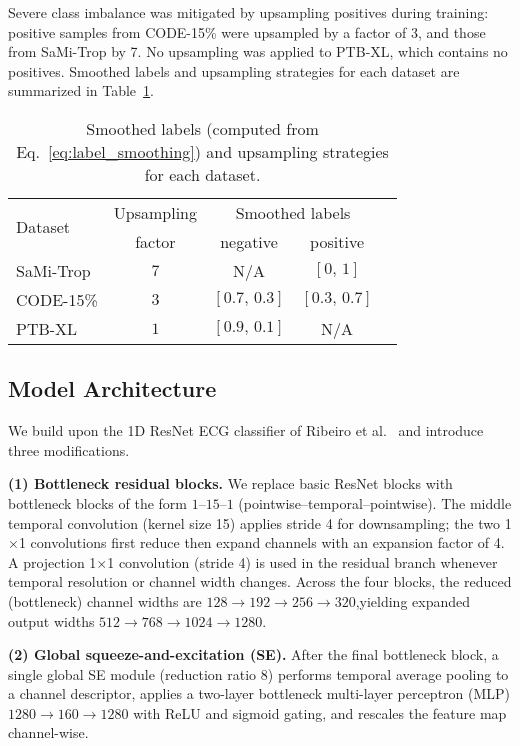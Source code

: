 Severe class imbalance was mitigated by upsampling positives during training: positive samples from CODE-15\% were upsampled by a factor of 3, and those from SaMi-Trop by 7. No upsampling was applied to PTB-XL, which contains no positives. Smoothed labels and upsampling strategies for each dataset are summarized in Table~\ref{tab:augmentation}.


\begin{table}[!htp]
\centering
\begin{tabular}{lcccc}
\toprule
\multirow{2}{*}{Dataset} & Upsampling & \multicolumn{2}{c}{Smoothed labels} \\ \cmidrule(lr){3-4}
& factor & negative & positive \\
\midrule
SaMi-Trop & $7$ & N/A           & $[0,\,1]$     \\
CODE-15\% & $3$ & $[0.7,\,0.3]$ & $[0.3,\,0.7]$ \\
PTB-XL    & $1$ & $[0.9,\,0.1]$ & N/A           \\
\bottomrule
\end{tabular}
\caption{Smoothed labels (computed from Eq.~\ref{eq:label_smoothing}) and upsampling strategies for each dataset.}
\label{tab:augmentation}
\end{table}


\subsection{Model Architecture}
\label{subsec:model}


We build upon the 1D ResNet ECG classifier of Ribeiro et al.~\cite{ribeiro2020automatic} and introduce three modifications.

\textbf{(1) Bottleneck residual blocks.} We replace basic ResNet blocks with bottleneck blocks of the form $1$–$15$–$1$ (pointwise--temporal--pointwise). The middle temporal convolution (kernel size 15) applies stride 4 for downsampling; the two 1$\times$1 convolutions first reduce then expand channels with an expansion factor of 4. A projection 1$\times$1 convolution (stride 4) is used in the residual branch whenever temporal resolution or channel width changes. Across the four blocks, the reduced (bottleneck) channel widths are $128 \to 192 \to 256 \to 320$,yielding expanded output widths $512 \to 768 \to 1024 \to 1280$.

\textbf{(2) Global squeeze-and-excitation (SE).} After the final bottleneck block, a single global SE module (reduction ratio 8) \cite{hu2018senet} performs temporal average pooling to a channel descriptor, applies a two-layer bottleneck multi-layer perceptron (MLP) $1280 \to 160 \to 1280$ with ReLU and sigmoid gating, and rescales the feature map channel-wise.

